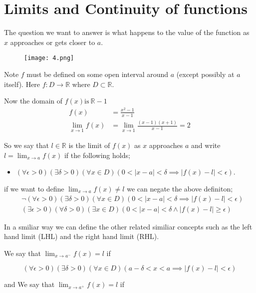 \documentclass[12pt,a4paper]{article}
\begin{document}
 \section{Limits and Continuity of functions} 

 The question we want to answer is what happens to the value of the function as \(x\) approaches or gets closer to \(a\). 

 \begin{figure}[ht]
     \centering
     \texttt{[image: 4.png]}
     \label{Label}
 \end{figure}
 Note \(f\) must be defined on some open interval around \(a\) (except possibly at \(a\) itself).  Here \(f:D \to \mathbb{R}\) where \(D \subset \mathbb{R}\).     
 
 Now the domain of \(f(x) \text{is} \ \mathbb{R}-1\)  
  \begin{align*}
     f(x) &= \frac{x^2 -1 }{x-1} \\
     \lim_{x \to 1} f(x) &= \lim_{x \to 1} \frac{(x-1)(x+1)}{x-1} = 2 
 \end{align*}

 So we say that \(l \in \mathbb{R}\) is the limit of \(f(x)\)  as \(x\) approaches \(a\)  and write \(l = \lim_{x \to a} f(x)\) if the following holds;
 \begin{itemize}
    \item \((\forall \epsilon > 0)(\exists \delta > 0)(\forall x \in D)(0 < |x-a| < \delta \implies |f(x) - l| < \epsilon)\).    
 \end{itemize}      
 
if we want to define \(\lim_{x \to a} f(x) \neq l\) we can negate the above definiton;
 \begin{align*}
    &\neg(\forall \epsilon > 0)(\exists \delta > 0)(\forall x \in D)(0 < |x-a| < \delta \implies |f(x) - l| < \epsilon) \\
    &(\exists \epsilon > 0)(\forall \delta > 0)( \exists x \in D)(0 <|x-a| < \delta \wedge |f(x) -l| \geq \epsilon)
\end{align*}   

In a smiliar way we can define the other related similiar concepts such as the left hand limit (LHL) and the right hand limit (RHL).

We say that \(\lim_{x \to a^{-}} f(x) =l \)  if 

\[(\forall \epsilon > 0)(\exists \delta > 0)(\forall x \in D)( a - \delta < x < a \implies |f(x) - l| < \epsilon )\] 

and We say that \(\lim_{x \to a^{+}} f(x) =l \)  if 
\end{document}
